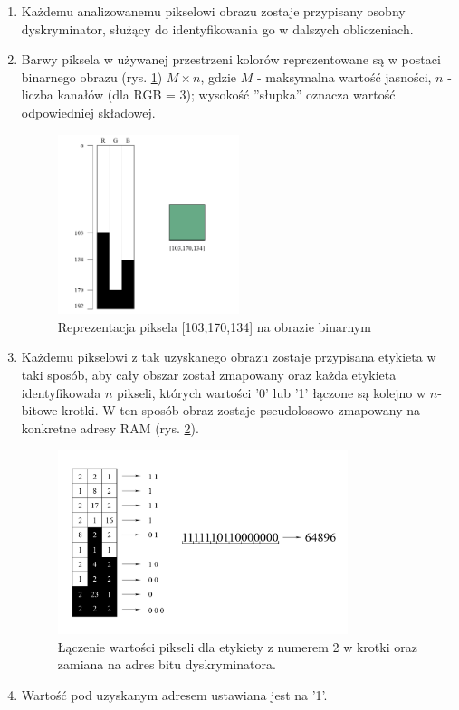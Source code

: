 \begin{enumerate}
\item Każdemu analizowanemu pikselowi obrazu zostaje przypisany osobny dyskryminator, służący do identyfikowania go w dalszych obliczeniach.
\item Barwy piksela w używanej przestrzeni kolorów reprezentowane są w postaci binarnego obrazu (rys. \ref{fig:binPixel}) $M \times n$, gdzie $M$ - maksymalna wartość jasności, $n$ - liczba kanałów (dla RGB = 3); wysokość ''słupka'' oznacza wartość odpowiedniej składowej.

\begin{figure}[!h]
\centering
\includegraphics[width=0.5\textwidth]{img/binPixel}
\caption{Reprezentacja piksela [103,170,134] na obrazie binarnym \label{fig:binPixel}}
\end{figure}

\item Każdemu pikselowi z tak uzyskanego obrazu zostaje przypisana etykieta w taki sposób, aby cały obszar został zmapowany oraz każda etykieta identyfikowała $n$ pikseli, których wartości '0' lub '1' łączone są kolejno w $n$-bitowe krotki. W ten sposób obraz zostaje pseudolosowo zmapowany na konkretne adresy RAM (rys. \ref{fig:map}).

\begin{figure}[!h]
\centering
\includegraphics[width=0.8\textwidth]{img/map}
\caption{Łączenie wartości pikseli dla etykiety z numerem 2 w krotki oraz zamiana na adres bitu dyskryminatora.\label{fig:map}}
\end{figure}


\item Wartość pod uzyskanym adresem ustawiana jest na '1'.
\end{enumerate}

